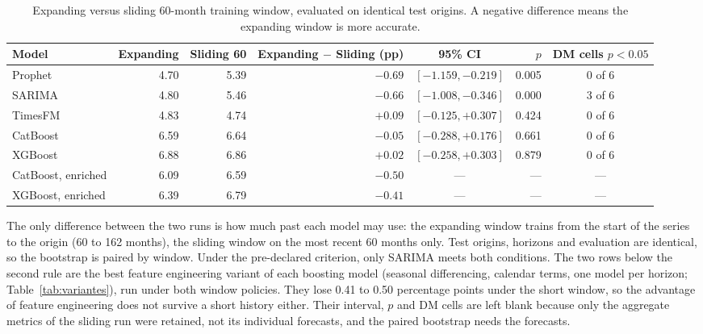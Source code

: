 \begin{table}[htbp]
\centering
\small
\setlength{\tabcolsep}{4pt}
\caption{Expanding versus sliding 60-month training window, evaluated on identical
test origins. A negative difference means the expanding window is more accurate.}
\label{tab:janela}
\begin{tabular}{lrrrcrc}
\toprule
Model & Expanding & Sliding 60 & Expanding $-$ Sliding (pp) & 95\% CI & $p$ & DM cells $p<0.05$ \\
\midrule
Prophet & 4.70 & 5.39 & $-0.69$ & $[-1.159, -0.219]$ & 0.005 & 0 of 6 \\
SARIMA & 4.80 & 5.46 & $-0.66$ & $[-1.008, -0.346]$ & 0.000 & 3 of 6 \\
TimesFM & 4.83 & 4.74 & $+0.09$ & $[-0.125, +0.307]$ & 0.424 & 0 of 6 \\
CatBoost & 6.59 & 6.64 & $-0.05$ & $[-0.288, +0.176]$ & 0.661 & 0 of 6 \\
XGBoost & 6.88 & 6.86 & $+0.02$ & $[-0.258, +0.303]$ & 0.879 & 0 of 6 \\
\midrule
CatBoost, enriched & 6.09 & 6.59 & $-0.50$ & --- & --- & --- \\
XGBoost, enriched & 6.39 & 6.79 & $-0.41$ & --- & --- & --- \\
\bottomrule
\end{tabular}

\vspace{0.5em}
\begin{minipage}{\textwidth}
\footnotesize
The only difference between the two runs is how much past each model may use: the
expanding window trains from the start of the series to the origin (60 to 162 months),
the sliding window on the most recent 60 months only. Test origins, horizons and
evaluation are identical, so the bootstrap is paired by window. Under the pre-declared
criterion, only SARIMA meets both conditions. The two rows below the second rule are the best feature engineering variant of each boosting model (seasonal differencing, calendar terms, one model per horizon; Table~\ref{tab:variantes}), run under both window policies. They lose 0.41 to 0.50 percentage points under the short window, so the advantage of feature engineering does not survive a short history either. Their interval, $p$ and DM cells are left blank because only the aggregate metrics of the sliding run were retained, not its individual forecasts, and the paired bootstrap needs the forecasts.
\end{minipage}
\end{table}
